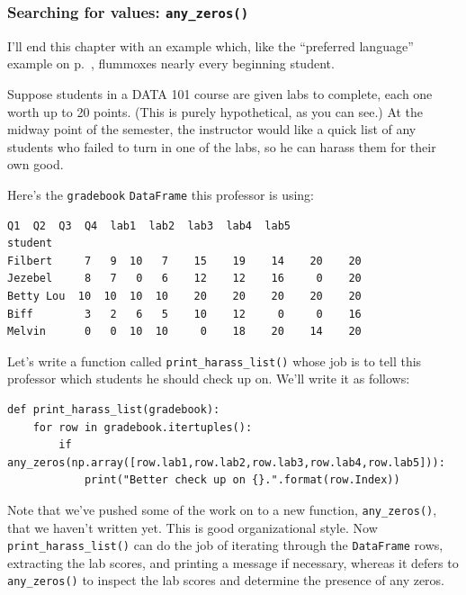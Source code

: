 \medskip

\subsubsection{Searching for values: \texttt{any\_zeros()}}

I'll end this chapter with an example which, like the ``preferred language''
example on p.~\pageref{spanishFrenchPitfall}, flummoxes nearly every beginning
student.

Suppose students in a DATA 101 course are given labs to complete, each one
worth up to 20 points. (This is purely hypothetical, as you can see.) At the
midway point of the semester, the instructor would like a quick list of any
students who failed to turn in one of the labs, so he can harass them for their
own good.


Here's the \texttt{gradebook} \texttt{DataFrame} this professor is using:

\begin{Verbatim}[fontsize=\small,samepage=true,frame=leftline,framesep=5mm,framerule=1mm]
           Q1  Q2  Q3  Q4  lab1  lab2  lab3  lab4  lab5
student                                                
Filbert     7   9  10   7    15    19    14    20    20
Jezebel     8   7   0   6    12    12    16     0    20
Betty Lou  10  10  10  10    20    20    20    20    20
Biff        3   2   6   5    10    12     0     0    16
Melvin      0   0  10  10     0    18    20    14    20
\end{Verbatim}


Let's write a function called \texttt{print\_harass\_list()} whose job is to
tell this professor which students he should check up on. We'll write it as
follows:

\begin{Verbatim}[fontsize=\footnotesize,samepage=true,frame=single,framesep=3mm]
def print_harass_list(gradebook):
    for row in gradebook.itertuples():
        if any_zeros(np.array([row.lab1,row.lab2,row.lab3,row.lab4,row.lab5])):
            print("Better check up on {}.".format(row.Index))
\end{Verbatim}


Note that we've pushed some of the work on to a new function,
\texttt{any\_zeros()}, that we haven't written yet. This is good organizational
style. Now \texttt{print\_harass\_list()} can do the job of iterating through
the \texttt{DataFrame} rows, extracting the lab scores, and printing a message
if necessary, whereas it defers to \texttt{any\_zeros()} to inspect the lab
scores and determine the presence of any zeros.

